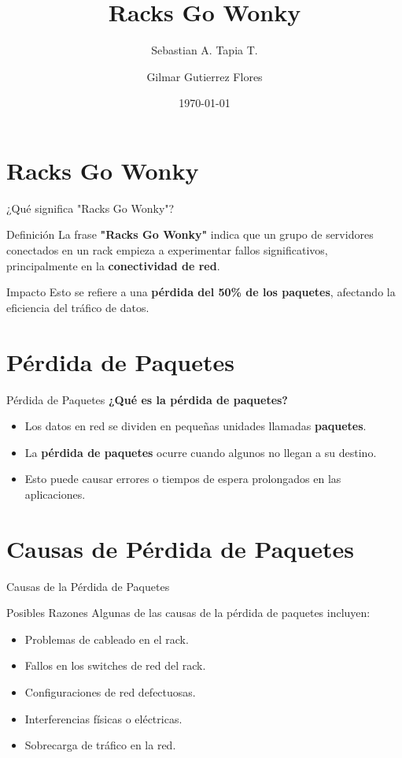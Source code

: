 \documentclass{beamer}
\title[Racks Go Wonky]{Racks Go Wonky}
\author{Sebastian A. Tapia T. \and Gilmar Gutierrez Flores}
\institute{Escuela Profesional de Ingeniería Estadística e Informática\\Universidad Nacional del Altiplano}
\date{\today}
\begin{document}
\begin{frame}
    \titlepage
\end{frame}





\section{Racks Go Wonky}
\begin{frame}{¿Qué significa "Racks Go Wonky"?}
    \begin{block}{Definición}
        La frase \textbf{"Racks Go Wonky"} indica que un grupo de servidores conectados en un rack empieza a experimentar fallos significativos, principalmente en la \textbf{conectividad de red}.
    \end{block}
    \begin{exampleblock}{Impacto}
        Esto se refiere a una \textbf{pérdida del 50\% de los paquetes}, afectando la eficiencia del tráfico de datos.
    \end{exampleblock}
\end{frame}

\section{Pérdida de Paquetes}
\begin{frame}{Pérdida de Paquetes}
    \textbf{¿Qué es la pérdida de paquetes?}
    \begin{itemize}
        \item Los datos en red se dividen en pequeñas unidades llamadas \textbf{paquetes}.
        \item La \textbf{pérdida de paquetes} ocurre cuando algunos no llegan a su destino.
        \item Esto puede causar errores o tiempos de espera prolongados en las aplicaciones.
    \end{itemize}
\end{frame}

\section{Causas de Pérdida de Paquetes}
\begin{frame}{Causas de la Pérdida de Paquetes}
    \begin{block}{Posibles Razones}
        Algunas de las causas de la pérdida de paquetes incluyen:
    \end{block}
    \begin{itemize}
        \item Problemas de cableado en el rack.
        \item Fallos en los switches de red del rack.
        \item Configuraciones de red defectuosas.
        \item Interferencias físicas o eléctricas.
        \item Sobrecarga de tráfico en la red.
    \end{itemize}
\end{frame}
\end{document}
